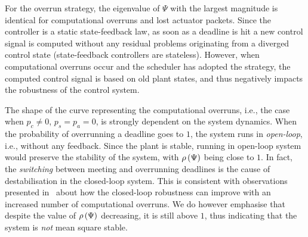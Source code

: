 For the \tK{} overrun strategy, the eigenvalue of $\Psi$ with the largest magnitude is identical for computational overruns and lost actuator packets.
Since the controller is a static state-feedback law, as soon as a deadline is hit a new control signal is computed without any residual problems originating from a diverged control state (state-feedback controllers are stateless).
However, when computational overruns occur and the scheduler has adopted the \tS{} strategy, the computed control signal is based on old plant states, and thus negatively impacts the robustness of the control system.

The shape of the curve representing the computational overruns, i.e., the case when $p_c \neq 0$, $p_s = p_a = 0$, is strongly dependent on the system dynamics.
When the probability of overrunning a deadline goes to $1$, the system runs in \emph{open-loop}, i.e., without any feedback.
Since the plant is stable, running in open-loop system would preserve the stability of the system, with $\rho\left( \Psi \right)$ being close to $1$.
In fact, the \emph{switching} between meeting and overrunning deadlines is the cause of destabilisation in the closed-loop system.
This is consistent with observations presented in~\cite{Vreman:2021} about how the closed-loop robustness can improve with an increased number of computational overruns.
We do however emphasise that despite the value of $\rho\left( \Psi \right)$ decreasing, it is still above $1$, thus indicating that the system is \emph{not} mean square stable.

